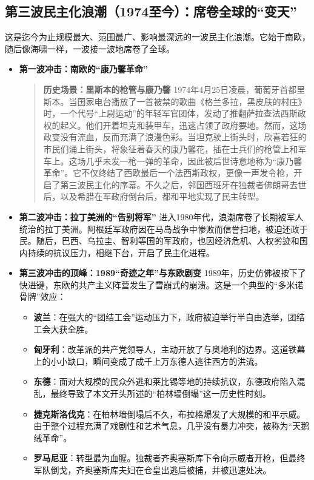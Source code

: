 \subsection{第三波民主化浪潮（1974至今）：席卷全球的“变天”}

这是迄今为止规模最大、范围最广、影响最深远的一波民主化浪潮。它始于南欧，随后像海啸一样，一波接一波地席卷了全球。

\begin{itemize}
    \item \textbf{第一波冲击：南欧的“康乃馨革命”}
    \begin{quote}
    \textbf{历史场景：里斯本的枪管与康乃馨}
    1974年4月25日凌晨，葡萄牙首都里斯本。当国家电台播放了一首被禁的歌曲《格兰多拉，黑皮肤的村庄》时，一个代号“上尉运动”的年轻军官团体，发动了推翻萨拉查法西斯政权的起义。他们开着坦克和装甲车，迅速占领了政府要地。然而，这场政变没有流血，反而充满了浪漫色彩。当坦克驶上街头时，欣喜若狂的市民们涌上街头，将象征着春天的康乃馨花，插在士兵们的枪管上和军车上。这场几乎未发一枪一弹的革命，因此被后世诗意地称为“康乃馨革命”。它不仅终结了西欧最后一个法西斯政权，更像一声发令枪，开启了第三波民主化的序幕。不久之后，邻国西班牙在独裁者佛朗哥去世后，以及希腊在军政府倒台后，都和平地实现了民主转型。
    \end{quote}
    \item \textbf{第二波冲击：拉丁美洲的“告别将军”}
    进入1980年代，浪潮席卷了长期被军人统治的拉丁美洲。阿根廷军政府因在马岛战争中惨败而信誉扫地，被迫还政于民。随后，巴西、乌拉圭、智利等国的军政府，也因经济危机、人权劣迹和国内持续的抗议压力，相继下台，开启了民主化进程。
    \item \textbf{第三波冲击的顶峰：1989“奇迹之年”与东欧剧变}
    1989年，历史仿佛被按下了快进键，东欧的共产主义阵营发生了雪崩式的崩溃。这是一个典型的“多米诺骨牌”效应：
    \begin{itemize}
        \item \textbf{波兰}：在强大的“团结工会”运动压力下，政府被迫举行半自由选举，团结工会大获全胜。
        \item \textbf{匈牙利}：改革派的共产党领导人，主动开放了与奥地利的边界。这道铁幕上的小小缺口，瞬间变成了成千上万东德人逃往西方的洪流。
        \item \textbf{东德}：面对大规模的民众外逃和莱比锡等地的持续抗议，东德政府陷入混乱，最终导致了本文开头所述的“柏林墙倒塌”这一历史性时刻。
        \item \textbf{捷克斯洛伐克}：在柏林墙倒塌后不久，布拉格爆发了大规模的和平示威。由于整个过程充满了戏剧性和艺术气息，几乎没有暴力冲突，被称为“天鹅绒革命”。
        \item \textbf{罗马尼亚}：转型最为血腥。独裁者齐奥塞斯库下令向示威者开枪，但最终军队倒戈，齐奥塞斯库夫妇在仓皇出逃后被捕，并被迅速处决。

\end{itemize}
\end{itemize}
